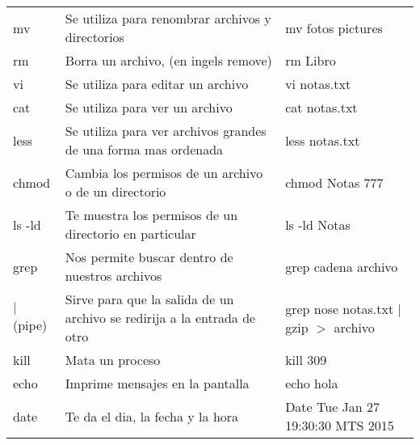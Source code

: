 \documentclass[12pt]{article}
\begin{document}
\begin{longtable}{|p{1 in}|p{3.0 in}|p{2 in}|}
mv & Se utiliza para renombrar archivos y directorios & mv fotos pictures \\

rm & Borra un archivo, (en ingels remove) & rm Libro \\

vi & Se utiliza para editar un archivo & vi notas.txt \\

cat & Se utiliza para ver un archivo & cat notas.txt \\

less & Se utiliza para ver archivos grandes de una forma mas ordenada & less notas.txt \\

chmod & Cambia los permisos de un archivo o de un directorio & chmod Notas 777 \\

ls -ld & Te muestra los permisos de un directorio en particular & ls -ld Notas \\

grep & Nos permite buscar dentro de nuestros archivos & grep cadena archivo \\

$|$ (pipe) & Sirve para que la salida de un archivo se redirija a la entrada de otro & grep nose notas.txt $|$ gzip $>$ archivo \\

kill & Mata un proceso & kill 309 \\

echo & Imprime mensajes en la pantalla & echo hola \\

date & Te da el dia, la fecha y la hora & Date
Tue Jan 27 19:30:30 MTS 2015 \\ \hline
\end{longtable}



\end{document}

